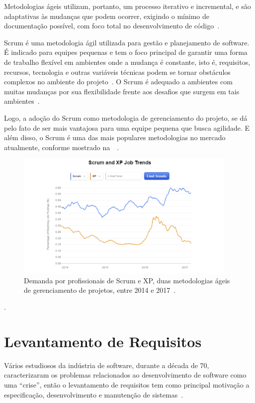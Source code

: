 Metodologias ágeis utilizam, portanto, um processo iterativo e incremental, e são adaptativas às mudanças que podem ocorrer, exigindo o mínimo de documentação possível, com foco total no desenvolvimento de código~\cite{vargas2014manual}.

Scrum é uma metodologia ágil utilizada para gestão e planejamento de software.
É indicado para equipes pequenas e tem o foco principal de garantir uma forma de trabalho flexível em ambientes onde a mudança é constante, isto é, requisitos, recursos, tecnologia e outras variáveis técnicas podem se tornar obstáculos complexos no ambiente do projeto~\cite{dos2004metodologias}.
O Scrum é adequado a ambientes com muitas mudanças por sua flexibilidade frente aos desafios que surgem em tais ambientes~\cite{dos2004metodologias}.

Logo, a adoção do Scrum como metodologia de gerenciamento do projeto, se dá pelo fato de ser mais vantajosa para uma equipe pequena que busca agilidade.
E além disso, o Scrum é uma das mais populares metodologias no mercado atualmente, conforme mostrado na~~\cite{paulk2013scrum}.

\begin{figure}[htbp]
    \centering
    \includegraphics[width=0.95\textwidth]{figuras/figura001.png}
    \caption[Figura 1: Demanda por profissionais de Scrum e XP]{Demanda por profissionais de Scrum e XP, duas metodologias ágeis de gerenciamento de projetos, entre 2014 e 2017~\cite{mazuco2017percepccoes}.}
    \label{Figura001}
\end{figure}.

\section{Levantamento de Requisitos}

Vários estudiosos da indústria de software, durante a década de 70, caracterizaram os problemas relacionados ao desenvolvimento de software como uma ``crise'', então o levantamento de requisitos tem como principal motivação a especificação, desenvolvimento e manutenção de sistemas~\cite{sommerville2007engenharia}.

